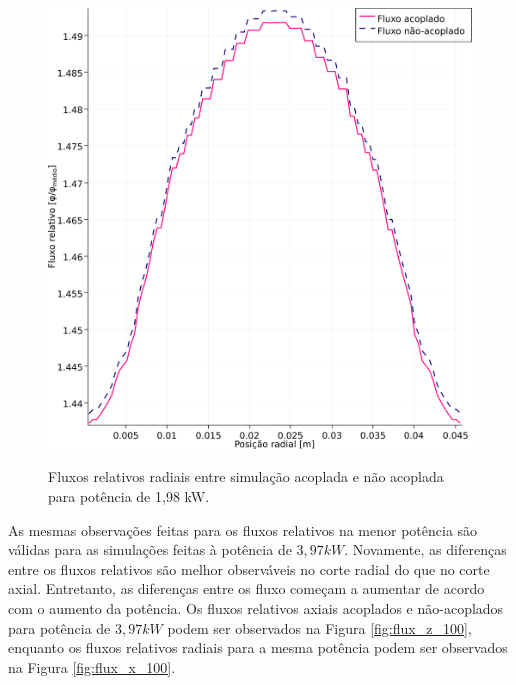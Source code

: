 \begin{figure}[htb]
  \caption{Fluxos relativos radiais entre simulação acoplada e não acoplada para
    potência de 1,98 kW.}
  \centering\includegraphics[scale=0.5]{figuras/Flux_rel_x_50_port.png}
  \label{fig:flux_x_50}
\end{figure}

As mesmas observações feitas para os fluxos relativos na menor potência são válidas
para as simulações feitas à potência de $3,97 kW$. Novamente, as diferenças entre
os fluxos relativos são melhor observáveis no corte radial do que no corte axial.
Entretanto, as diferenças entre os fluxo começam a aumentar de acordo com o
aumento da potência. Os fluxos relativos axiais acoplados e não-acoplados para
potência de $3,97 kW$ podem ser observados na Figura \ref{fig:flux_z_100}, enquanto
os fluxos relativos radiais para a mesma potência podem ser observados na Figura \ref{fig:flux_x_100}.

